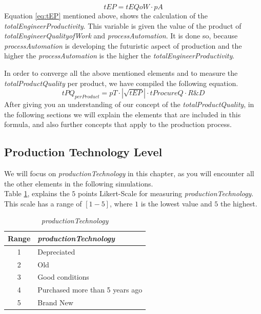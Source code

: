 \begin{equation}
tEP=tEQoW \cdot pA
\label{eq:tEP}
\end{equation}
Equation \ref{eq:tEP} mentioned above, shows the calculation of the \textit{totalEngineerProductivity}. This variable is given the value of the product of \textit{totalEngineerQualityofWork} and \textit{processAutomation}. It is done so, because \textit{processAutomation} is developing the futuristic  aspect of production and the higher the \textit{processAutomation} is the higher the \textit{totalEngineerProductivity}. 

In order to converge all the above mentioned elements and to measure the \textit{totalProductQuality} per product, we have compiled the following equation. 
\begin{equation}
tPQ_{perProduct} = pT \cdot |\sqrt{tEP}| \cdot tProcureQ \cdot R\&D
\label{eq:PQ}
\end{equation}
After giving you an understanding of our concept of the \textit{totalProductQuality}, in the following sections we will explain the elements that  are included in this formula, and also further concepts that apply to the production process.

\subsection{Production Technology Level}
We will focus on \textit{productionTechnology} in this chapter, as you will encounter all the other elements in the following simulations. \\
Table \ref{table:my-label}, explains the $5$ points Likert-Scale for measuring \textit{productionTechnology}. This scale has a range of $[1-5]$, where $1$ is the lowest value and $5$ the highest.

\begin{table}[ht]
\centering
\begin{tabular}{|c|l|}
\hline
 Range & \textit{productionTechnology}\\
\hline
 1 & Depreciated  \\
 2 & Old \\
 3 & Good conditions \\
 4 & Purchased more than 5 years ago  \\
 5 & Brand New\\
\hline
\end{tabular}
\caption{\textit{productionTechnology}}
\label{table:my-label}
\end{table}

